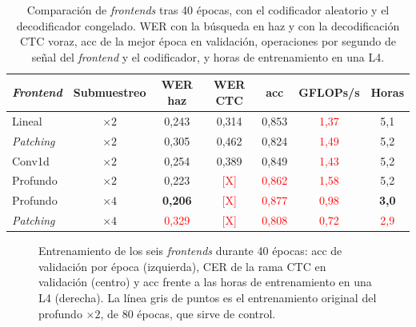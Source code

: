 \begin{table}[htbp]
  \centering
  \caption{Comparación de \textit{frontends} tras 40 épocas, con el codificador aleatorio y el decodificador congelado. WER con la búsqueda en haz y con la decodificación CTC voraz, acc de la mejor época en validación, operaciones por segundo de señal del \textit{frontend} y el codificador, y horas de entrenamiento en una L4.}
  \label{tab:res-frontends}
  \small
  \begin{tabular}{lcccccc}
    \toprule
    \textbf{\textit{Frontend}} & \textbf{Submuestreo} & \textbf{WER haz} & \textbf{WER CTC} & \textbf{acc} & \textbf{GFLOPs/s} & \textbf{Horas} \\
    \midrule
    Lineal                    & $\times 2$ & 0,243 & 0,314 & 0,853 & \textcolor{red}{1,37} & 5,1 \\
    \textit{Patching}         & $\times 2$ & 0,305 & 0,462 & 0,824 & \textcolor{red}{1,49} & 5,2 \\
    Conv1d                    & $\times 2$ & 0,254 & 0,389 & 0,849 & \textcolor{red}{1,43} & 5,2 \\
    Profundo                  & $\times 2$ & 0,223 & \textcolor{red}{[X]} & \textcolor{red}{0,862} & \textcolor{red}{1,58} & 5,2 \\
    Profundo                  & $\times 4$ & \textbf{0,206} & \textcolor{red}{[X]} & \textcolor{red}{0,877} & \textcolor{red}{0,98} & \textbf{3,0} \\
    \textit{Patching}         & $\times 4$ & \textcolor{red}{0,329} & \textcolor{red}{[X]} & \textcolor{red}{0,808} & \textcolor{red}{0,72} & \textcolor{red}{2,9} \\
    \bottomrule
  \end{tabular}
\end{table}

\begin{figure}[htbp]
  \centering
  \caption{Entrenamiento de los seis \textit{frontends} durante 40 épocas: acc de validación por época (izquierda), CER de la rama CTC en validación (centro) y acc frente a las horas de entrenamiento en una L4 (derecha). La línea gris de puntos es el entrenamiento original del profundo $\times 2$, de 80 épocas, que sirve de control.}
  \label{fig:res-frontends-curvas}
\end{figure}

